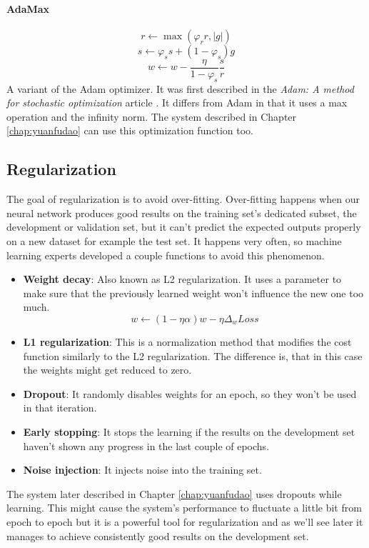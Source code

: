 \paragraph*{AdaMax}
\[r \leftarrow \max(\varphi_r r, |g|)\]
\[s \leftarrow \varphi_s s + (1 - \varphi_s) g\]
\[w \leftarrow w - \frac{\eta}{1 - \varphi_s}\frac{s}{r}\]
A variant of the Adam optimizer. It was first described in the \textit{Adam: A method for stochastic optimization} article \cite{Kingma:2015}. It differs from Adam in that it uses a max operation and the infinity norm. The system described in Chapter \ref{chap:yuanfudao} can use this optimization function too.

\subsection{Regularization}
The goal of regularization is to avoid over-fitting. Over-fitting happens when our neural network produces good results on the training set's dedicated subset, the development or validation set, but it can't predict the expected outputs properly on a new dataset for example the test set. It happens very often, so machine learning experts developed a couple functions to avoid this phenomenon.
\begin{itemize}
	\item \textbf{Weight decay}: Also known as L2 regularization. It uses a parameter to make sure that the previously learned weight won't influence the new one too much. \[w \leftarrow (1 - \eta \alpha)w - \eta \Delta_w Loss\]
	\item \textbf{L1 regularization}: This is a normalization method that modifies the cost function similarly to the L2 regularization. The difference is, that in this case the weights might get reduced to zero.
	\item \textbf{Dropout}: It randomly disables weights for an epoch, so they won't be used in that iteration.
	\item \textbf{Early stopping}: It stops the learning if the results on the development set haven't shown any progress in the last couple of epochs.
	\item \textbf{Noise injection}: It injects noise into the training set.
\end{itemize}

The system later described in Chapter \ref{chap:yuanfudao} uses dropouts while learning. This might cause the system's performance to fluctuate a little bit from epoch to epoch but it is a powerful tool for regularization and as we'll see later it manages to achieve consistently good results on the development set.

